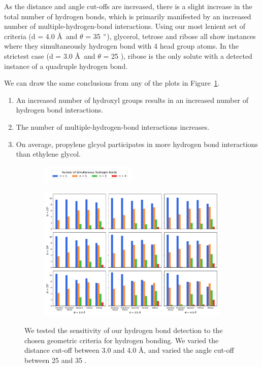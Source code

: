 \documentclass{article}
\begin{document}
  As the distance and angle cut-offs are increased, there is a slight increase in the total
  number of hydrogen bonds, which is primarily manifested by an increased number of multiple-hydrogen-bond
  interactions. Using our most lenient set of criteria (d = 4.0 \AA~and $\theta$ = 35 $\degree$), glycerol,
  tetrose and ribose all show instances where they simultaneously hydrogen bond with 4 head group atoms.
  In the strictest case (d = 3.0 \AA~and $\theta$ = 25 \degree), ribose is the only solute with a 
  detected instance of a quadruple hydrogen bond.
  
  We can draw the same conclusions from any of the plots in Figure~\ref{fig:hbond_sensitivity}. 
  \begin{enumerate}
    \item An increased number of hydroxyl groups results in an increased number of hydrogen bond
    interactions.
    \item The number of multiple-hydrogen-bond interactions increases.
    \item On average, propylene glcyol participates in more hydrogen bond interactions than 
    ethylene glycol.  %
  \end{enumerate}
  
  \begin{figure}[!htb]
  \centering
  \begin{subfigure}{\textwidth}
  \centering
  \includegraphics[trim={0 0.5cm 0.5cm 0.5cm}, clip, width=0.5\textwidth]{hbond_sensitivity_legend.pdf}
  \end{subfigure}
  \begin{subfigure}{\textwidth}
  \includegraphics[width=\textwidth]{hbond_sensitivity.pdf}
  \end{subfigure}
  \caption{We tested the sensitivity of our hydrogen bond detection to the chosen 
  geometric criteria for hydrogen bonding. We varied the distance cut-off between 3.0 and
  4.0 \AA, and varied the angle cut-off between 25 and 35 \degree.}\label{fig:hbond_sensitivity}
  \end{figure}
\end{document}

